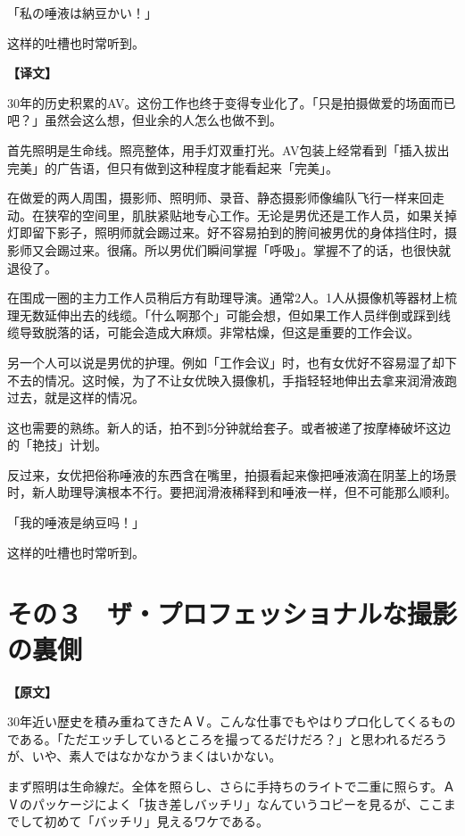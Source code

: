 \documentclass[12pt,UTF8]{ctexbook}
\begin{document}
{「私の唾液は納豆かい！」

这样的吐槽也时常听到。

\vspace{2ex}
\parbox{0.9\linewidth}{
\textbf{【译文】}\par

30年的历史积累的AV。这份工作也终于变得专业化了。「只是拍摄做爱的场面而已吧？」虽然会这么想，但业余的人怎么也做不到。

首先照明是生命线。照亮整体，用手灯双重打光。AV包装上经常看到「插入拔出完美」的广告语，但只有做到这种程度才能看起来「完美」。

在做爱的两人周围，摄影师、照明师、录音、静态摄影师像编队飞行一样来回走动。在狭窄的空间里，肌肤紧贴地专心工作。无论是男优还是工作人员，如果关掉灯即留下影子，照明师就会踢过来。好不容易拍到的胯间被男优的身体挡住时，摄影师又会踢过来。很痛。所以男优们瞬间掌握「呼吸」。掌握不了的话，也很快就退役了。

在围成一圈的主力工作人员稍后方有助理导演。通常2人。1人从摄像机等器材上梳理无数延伸出去的线缆。「什么啊那个」可能会想，但如果工作人员绊倒或踩到线缆导致脱落的话，可能会造成大麻烦。非常枯燥，但这是重要的工作会议。

另一个人可以说是男优的护理。例如「工作会议」时，也有女优好不容易湿了却下不去的情况。这时候，为了不让女优映入摄像机，手指轻轻地伸出去拿来润滑液跑过去，就是这样的情况。

这也需要的熟练。新人的话，拍不到5分钟就给套子。或者被递了按摩棒破坏这边的「艳技」计划。

反过来，女优把俗称唾液的东西含在嘴里，拍摄看起来像把唾液滴在阴茎上的场景时，新人助理导演根本不行。要把润滑液稀释到和唾液一样，但不可能那么顺利。

「我的唾液是纳豆吗！」

这样的吐槽也时常听到。
}

\section{その３　ザ・プロフェッショナルな撮影の裏側}

\vspace{1ex}
\parbox{0.9\linewidth}{
\textbf{【原文】}\par

30年近い歴史を積み重ねてきたＡⅤ。こんな仕事でもやはりプロ化してくるものである。「ただエッチしているところを撮ってるだけだろ？」と思われるだろうが、いや、素人ではなかなかうまくはいかない。

まず照明は生命線だ。全体を照らし、さらに手持ちのライトで二重に照らす。ＡⅤのパッケージによく「抜き差しバッチリ」なんていうコピーを見るが、ここまでして初めて「バッチリ」見えるワケである。

}}
\end{document}
